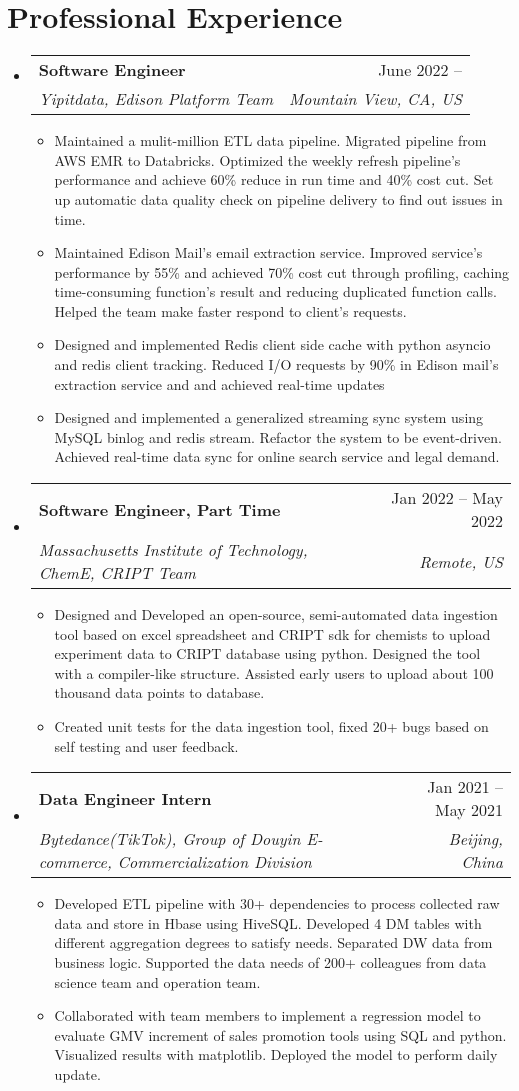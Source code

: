 \documentclass[letterpaper,11pt]{article}
\makeatletter
\newcommand{\resumeItem}[1]{
  \item\small{
    {#1 \vspace{-2pt}}
  }
}
\newcommand{\resumeSubheading}[4]{
  \vspace{-2pt}\item
    \begin{tabular*}{0.97\textwidth}[t]{l@{\extracolsep{\fill}}r}
      \textbf{#1} & #2 \\
      \textit{\small#3} & \textit{\small #4} \\
    \end{tabular*}\vspace{-7pt}
}
\newcommand{\resumeSubHeadingListStart}{\begin{itemize}[leftmargin=0.15in, label={}]}
\newcommand{\resumeSubHeadingListEnd}{\end{itemize}}
\newcommand{\resumeItemListStart}{\begin{itemize}}
\newcommand{\resumeItemListEnd}{\end{itemize}\vspace{-5pt}}
\makeatother
\begin{document}
\section{Professional Experience}
  \resumeSubHeadingListStart
    \resumeSubheading
      {Software Engineer}{June 2022 -- }
      {Yipitdata, Edison Platform Team}{Mountain View, CA, US}
      \resumeItemListStart
      \resumeItem{Maintained a mulit-million ETL data pipeline. Migrated pipeline from AWS EMR to Databricks. Optimized the weekly refresh pipeline's performance and achieve 60\% reduce in run time and 40\% cost cut. Set up automatic data quality check on pipeline delivery to find out issues in time.}
        \resumeItem{Maintained Edison Mail's email extraction service. Improved service's performance by 55\% and achieved 70\% cost cut through profiling, caching time-consuming function's result and reducing duplicated function calls. Helped the team make faster respond to client's requests.}
        \resumeItem{Designed and implemented Redis client side cache with python asyncio and redis client tracking. Reduced I/O requests by 90\% in Edison mail's extraction service and and achieved real-time updates}
        \resumeItem{Designed and implemented a generalized streaming sync system using MySQL binlog and redis stream. Refactor the system to be event-driven. Achieved real-time data sync for online search service and legal demand.}
      \resumeItemListEnd
    \resumeSubheading
      {Software Engineer, Part Time}{Jan 2022 -- May 2022}
      {Massachusetts Institute of Technology, ChemE, CRIPT Team}{Remote, US}
      \resumeItemListStart
        \resumeItem{Designed and Developed an open-source, semi-automated data ingestion tool based on excel spreadsheet and CRIPT sdk for chemists to upload experiment data to CRIPT database using python. Designed the tool with a compiler-like structure. Assisted early users to upload about 100 thousand data points to database.}
        \resumeItem{Created unit tests for the data ingestion tool, fixed 20+ bugs based on self testing and user feedback.}
      \resumeItemListEnd
    \resumeSubheading
      {Data Engineer Intern}{Jan 2021 -- May 2021}
      {Bytedance(TikTok), Group of Douyin E-commerce, Commercialization Division}{Beijing, China}
      \resumeItemListStart
        \resumeItem{Developed ETL pipeline with 30+ dependencies to process collected raw data and store in Hbase using HiveSQL. Developed 4 DM tables with different aggregation degrees to satisfy needs. Separated DW data from business logic. Supported the data needs of 200+ colleagues from data science team and operation team.}
        \resumeItem{Collaborated with team members to implement a regression model to evaluate GMV increment of sales promotion tools using SQL and python. Visualized results with matplotlib. Deployed the model to perform daily update.}
      \resumeItemListEnd
  \resumeSubHeadingListEnd
\end{document}
